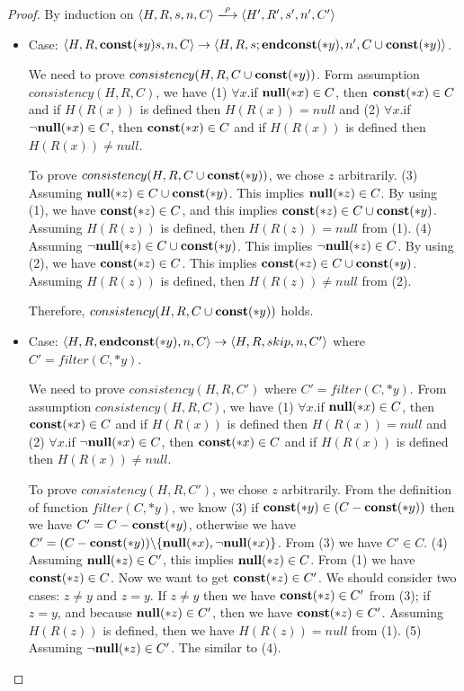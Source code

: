 \begin{proof}
  By induction on \(\langle H, R, s, n, C \rangle
  \xlongrightarrow{\rho} \langle H', R', s', n', C'\rangle \)
 \begin{itemize}
    
  \item Case: \(\langle H, R, \mathbf{const}(*y) s, n, C \rangle \rightarrow
    \langle H, R, s;\mathbf{endconst}(*y), n', C \cup {\mathbf{const}(*y)} \rangle \).

    We need to prove \(consistency(H, R, C \cup {\mathbf{const}(*y)})\). Form
    assumption \(consistency(H, R, C)\), we have (1) \(\forall x\).if
    \({\bf null}(*x) \in C\), then \(\mathbf{const}(*x) \in C\) and if \(H(R(x))\) is
    defined then \(H(R(x)) = null\) and (2) \(\forall x\).if
    \(\neg{\bf null}(*x) \in C\), then \(\mathbf{const}(*x) \in C\) and if \(H(R(x))\) is
    defined then \(H(R(x)) \ne null\).

    To prove \(consistency(H, R, C \cup {\mathbf{const}(*y)})\), we chose \(z\)
    arbitrarily. (3) Assuming \(\mathbf{null}(*z) \in C\cup{\mathbf{const}(*y)}\). This
    implies \(\mathbf{null}(*z) \in C\). By using (1), we have \(\mathbf{const}(*z) \in
    C\), and this implies \(\mathbf{const}(*z) \in C \cup
    \mathbf{const}(*y)\). Assuming \(H(R(z))\) is defined, then \(H(R(z)) =
    null\) from (1). (4) Assuming \(\neg\mathbf{null}(*z) \in C\cup{\mathbf{const}(*y)}\). This
    implies \(\neg\mathbf{null}(*z) \in C\). By using (2), we have \(\mathbf{const}(*z) \in
    C\). This implies \(\mathbf{const}(*z) \in C \cup
    \mathbf{const}(*y)\). Assuming \(H(R(z))\) is defined, then \(H(R(z)) \ne
    null\) from (2). 
    
    Therefore, \(consistency(H, R, C \cup {\mathbf{const}(*y)})\) holds.

\item Case: \(\langle H, R, \mathbf{endconst}(*y), n, C \rangle \rightarrow
    \langle H, R, skip, n, C'\rangle \) where \(C' = filter(C, *y)\).

    We need to prove \(consistency(H, R, C')\) where \(C' = filter(C,
    *y)\). From assumption \(consistency(H, R, C)\), we have (1)
    \(\forall x\).if \({\bf null}(*x) \in C\), then \(\mathbf{const}(*x) \in C\) and
    if \(H(R(x))\) is defined then \(H(R(x)) = null\) and (2)
    \(\forall x\).if \(\neg{\bf null}(*x) \in C\), then \(\mathbf{const}(*x) \in C\) and
    if \(H(R(x))\) is defined then \(H(R(x)) \ne null\).

    To prove \(consistency(H, R, C')\), we chose \(z\)
    arbitrarily. From the definition of function \(filter(C, *y)\), we
    know (3) if \(\mathbf{const}(*y) \in (C - \mathbf{const}(*y))\) then we have \(C' =
    C - \mathbf{const}(*y)\), otherwise we have \(C' = (C -
    \mathbf{const}(*y))\backslash\{{\bf null}(*x), \neg{\bf null}(*x)\}\). From (3) we have \(C'
    \in C\). (4) Assuming \(\mathbf{null}(*z) \in C'\), this implies
    \(\mathbf{null}(*z) \in C\). From (1) we have \(\mathbf{const}(*z) \in C\). Now we
    want to get \(\mathbf{const}(*z) \in C'\). We should consider two cases:
    \(z \ne y\) and \(z = y\). If \(z \ne y\) then we have \(\mathbf{const}(*z)
    \in C'\) from (3); if \(z = y\), and because \(\mathbf{null}(*z) \in C'\),
    then we have \(\mathbf{const}(*z) \in C'\). Assuming \(H(R(z))\) is
    defined, then we have \(H(R(z)) = null\) from (1). (5) Assuming
    \(\neg\mathbf{null}(*z) \in C'\). The similar to (4).


\end{itemize}
\end{proof}
